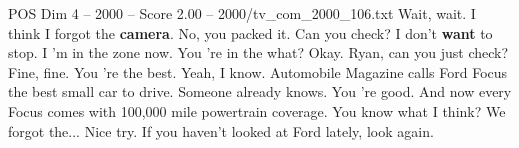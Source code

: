 \begin{textsample}{POS Dim 4 – 2000 – Score 2.00 – 2000/tv\_com\_2000\_106.txt}  \label{ex:f4_pos_073}
Wait, wait.
I think I forgot the \textbf{camera}.
No, you packed it.
Can you check?
I don't \textbf{want} to stop.
I 'm in the zone now.
You 're in the what?
Okay.
Ryan, can you just check?
Fine, fine.
You 're the best.
Yeah, I know.
Automobile Magazine calls Ford Focus the best small car to drive.
Someone already knows.
You 're good.
And now every Focus comes with 100,000 mile powertrain coverage.
You know what I think?
We forgot the...
Nice try.
If you haven't looked at Ford lately, look again.

\end{textsample}
